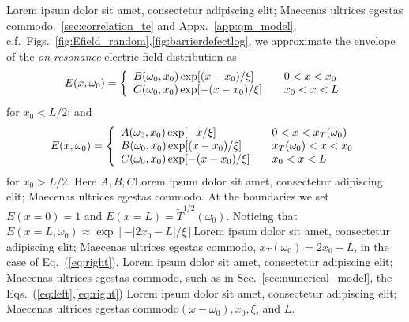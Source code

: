 Lorem ipsum dolor sit amet, consectetur adipiscing elit; Maecenas ultrices egestas commodo.~\ref{sec:correlation_te} and Appx.~\ref{app:qm_model}, c.f.~Figs.~\ref{fig:Efield_random},\ref{fig:barrierdefectlog}, we approximate the envelope of the {\it on-resonance} electric field distribution as
\begin{equation}
E(x,\omega_0) = \left\{
\begin{array}{l l}
B(\omega_0,x_0) \exp [ (x-x_0)/\xi ] &\quad 0 < x < x_0 \\
C(\omega_0,x_0) \exp [-(x-x_0)/\xi ] &\quad x_0 < x < L\\
\end{array} \right.
\label{eq:left}
\end{equation}
for $x_0<L/2$; and
\begin{equation}
E(x,\omega_0) = \left\{
\begin{array}{l l}
 A(\omega_0,x_0) \exp [-x      /\xi ] &\quad 0 < x < x_T(\omega_0)   \\
 B(\omega_0,x_0) \exp [ (x-x_0)/\xi ] &\quad x_T(\omega_0) < x < x_0 \\
 C(\omega_0,x_0) \exp [-(x-x_0)/\xi ] &\quad x_0 < x < L \\
\end{array} \right.
\label{eq:right}
\end{equation}
for $x_0>L/2$. Here $A,B,C$Lorem ipsum dolor sit amet, consectetur adipiscing elit; Maecenas ultrices egestas commodo. At the boundaries we set $E(x=0)=1$ and $E(x=L)=\tilde{T}^{1/2}(\omega_0)$. Noticing that $E(x=L,\omega_0)\approx\exp\left[ -|2x_0-L|/\xi\right]$Lorem ipsum dolor sit amet, consectetur adipiscing elit; Maecenas ultrices egestas commodo, $x_T(\omega_0)=2x_0-L$, in the case of Eq.~(\ref{eq:right}). Lorem ipsum dolor sit amet, consectetur adipiscing elit; Maecenas ultrices egestas commodo, such as in Sec.~\ref{sec:numerical_model}, the Eqs.~(\ref{eq:left},\ref{eq:right}) Lorem ipsum dolor sit amet, consectetur adipiscing elit; Maecenas ultrices egestas commodo$(\omega-\omega_0),x_0,\xi$, and $L$.

